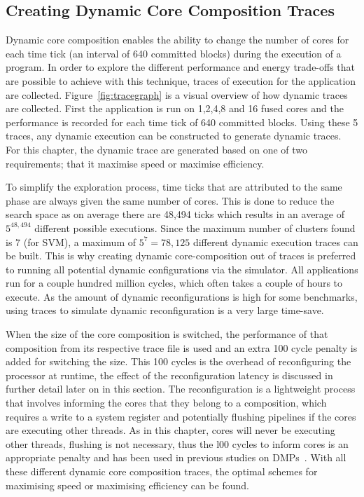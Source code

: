 \subsection{Creating Dynamic Core Composition Traces}

Dynamic core composition enables the ability to change the number of cores for each time tick (an interval of 640 committed blocks) during the execution of a program.
In order to explore the different performance and energy trade-offs that are possible to achieve with this technique, traces of execution for the application are collected.
Figure~\ref{fig:tracegraph} is a visual overview of how dynamic traces are collected.
First the application is run on 1,2,4,8 and 16 fused cores and the performance is recorded for each time tick of 640 committed blocks.
Using these 5 traces, any dynamic execution can be constructed to generate dynamic traces.
For this chapter, the dynamic trace are generated based on one of two requirements; that it maximise speed or maximise efficiency.

To simplify the exploration process, time ticks that are attributed to the same phase are always given the same number of cores.
This is done to reduce the search space as on average there are 48,494 ticks which results in an average of $5^{48,494}$ different possible executions.
Since the maximum number of clusters found is 7 (for SVM), a maximum of $5^{7} = 78,125$ different dynamic execution traces can be built.
This is why creating dynamic core-composition out of traces is preferred to running all potential dynamic configurations via the simulator.
All applications run for a couple hundred million cycles, which often takes a couple of hours to execute.
As the amount of dynamic reconfigurations is high for some benchmarks, using traces to simulate dynamic reconfiguration is a very large time-save.

When the size of the core composition is switched, the performance of that composition from its respective trace file is used and an extra 100 cycle penalty is added for switching the size.
This 100 cycles is the overhead of reconfiguring the processor at runtime, the effect of the reconfiguration latency is discussed in further detail later on in this section.
The reconfiguration is a lightweight process that involves informing the cores that they belong to a composition, which requires a write to a system register and potentially flushing pipelines if the cores are executing other threads.
As in this chapter, cores will never be executing other threads, flushing is not necessary, thus the l00 cycles to inform cores is an appropriate penalty and has been used in previous studies on DMPs~\cite{pricopi2012bahurupi}.
With all these different dynamic core composition traces, the optimal schemes for maximising speed or maximising efficiency can be found.

